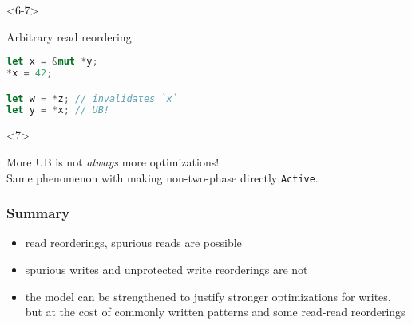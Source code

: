 \begin{frame}[fragile, t]
    \begin{onlyenv}<6-7>
        \begin{block}{{\xmark} Arbitrary read reordering}
            \begin{lstlisting}[language=rust]
let x = &mut *y;
*x = 42;

let w = *z; // invalidates `x`
let y = *x; // UB!
            \end{lstlisting}
        \end{block}
    \end{onlyenv}

    \begin{onlyenv}<7>
        \begin{block}{}
            More UB is not \textit{always} more optimizations!\\
            Same phenomenon with making non-two-phase directly \texttt{Active}.
        \end{block}
    \end{onlyenv}
\end{frame}

\begin{frame}
    \frametitle{Summary}
    \begin{itemize}
        \item read reorderings, spurious reads are possible
        \item spurious writes and unprotected write reorderings are not
        \item the model can be strengthened to justify stronger optimizations for
            writes, but at the cost of commonly written patterns and some read-read reorderings
    \end{itemize}
\end{frame}
